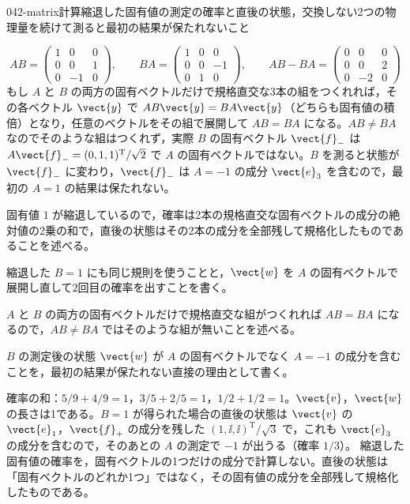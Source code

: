\documentclass[uplatex,dvipdfmx,a4paper,11pt]{jsarticle}
\begin{document}
\begin{mondai}{042-matrix}{計算}{縮退した固有値の測定の確率と直後の状態，交換しない2つの物理量を続けて測ると最初の結果が保たれないこと}
\begin{tadashii}
\[ AB=\begin{pmatrix}1&0&0\\0&0&1\\0&-1&0\end{pmatrix},\qquad BA=\begin{pmatrix}1&0&0\\0&0&-1\\0&1&0\end{pmatrix},\qquad AB-BA=\begin{pmatrix}0&0&0\\0&0&2\\0&-2&0\end{pmatrix} \]
もし $A$ と $B$ の両方の固有ベクトルだけで規格直交な3本の組をつくれれば，その各ベクトル $\vect{y}$ で $AB\vect{y}=BA\vect{y}$（どちらも固有値の積倍）となり，任意のベクトルをその組で展開して $AB=BA$ になる。$AB\ne BA$ なのでそのような組はつくれず，実際 $B$ の固有ベクトル $\vect{f}_{-}$ は $A\vect{f}_{-}=(0,1,1)^{\mathrm{T}}/\sqrt{2}$ で $A$ の固有ベクトルではない。$B$ を測ると状態が $\vect{f}_{-}$ に変わり，$\vect{f}_{-}$ は $A=-1$ の成分 $\vect{e}_{3}$ を含むので，最初の $A=1$ の結果は保たれない。
\begin{ronten}
  \item {} 固有値 $1$ が縮退しているので，確率は2本の規格直交な固有ベクトルの成分の絶対値の2乗の和で，直後の状態はその2本の成分を全部残して規格化したものであることを述べる。
  \item {} 縮退した $B=1$ にも同じ規則を使うことと，$\vect{w}$ を $A$ の固有ベクトルで展開し直して2回目の確率を出すことを書く。
  \item {} $A$ と $B$ の両方の固有ベクトルだけで規格直交な組がつくれれば $AB=BA$ になるので，$AB\ne BA$ ではそのような組が無いことを述べる。
  \item {} $B$ の測定後の状態 $\vect{w}$ が $A$ の固有ベクトルでなく $A=-1$ の成分を含むことを，最初の結果が保たれない直接の理由として書く。
\end{ronten}
\kenzan 確率の和：$5/9+4/9=1$，$3/5+2/5=1$，$1/2+1/2=1$。$\vect{v}$，$\vect{w}$ の長さは1である。$B=1$ が得られた場合の直後の状態は $\vect{v}$ の $\vect{e}_{1}$，$\vect{f}_{+}$ の成分を残した $(1,\ii,\ii)^{\mathrm{T}}/\sqrt{3}$ で，これも $\vect{e}_{3}$ の成分を含むので，そのあとの $A$ の測定で $-1$ が出うる（確率 $1/3$）。
\tsumazuki 縮退した固有値の確率を，固有ベクトルの1つだけの成分で計算しない。直後の状態は「固有ベクトルのどれか1つ」ではなく，その固有値の成分を全部残して規格化したものである。
\end{tadashii}
\end{mondai}
\end{document}
